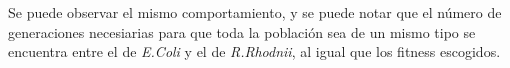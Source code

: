 \documentclass[12pt]{article}
\numberwithin{equation}{section}
\begin{document}
\begin{figure}[!ht]
\begin{floatrow}
\end{floatrow}
\FloatBarrier
\end{figure}
\FloatBarrier
Se puede observar el mismo comportamiento, y se puede notar que el número de generaciones necesiarias para que toda la población sea de un mismo tipo se encuentra entre el de \textit{E.Coli} y el de \textit{R.Rhodnii}, al igual que los fitness escogidos.\\
\end{document}
